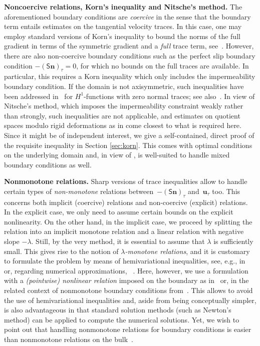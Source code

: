 \documentclass[reqno,a4paper]{amsart}
\def\tens#1{\pmb{\mathsf{#1}}}
\def\vec#1{\boldsymbol{#1}}
\def\bn{\vec{n}}
\def\bu{\vec{u}}
\def\BS{\tens{S}}
\begin{document}
	\textbf{Noncoercive relations, Korn's inequality and Nitsche's method.} 
	The aforementioned boundary conditions are  \emph{coercive} in the sense that the boundary term entails estimates on the tangential velocity traces. 
	In this case, one may employ standard versions of Korn's inequality to bound the norms of the full gradient in terms of the symmetric gradient and a \emph{full} trace term, see~\cite{Nitsche1981, BulicekMalekRajagopal2007}. 
	However, there are also non-coercive boundary conditions such as the perfect slip boundary condition $-(\BS \bn)_{\tau} = 0$, for which no bounds on the full traces are available. In particular, this requires  a Korn inequality which only includes the impermeability boundary condition. 
	If the domain is not axisymmetric, such inequalities have been addressed in~\cite{DesvillettesVillani2002} for $H^{1}$-functions with zero normal traces; see also~\cite{Bauer2016,BP.2016,Dominguez2022}. 
	In view of Nitsche's method, which imposes the impermeability constraint weakly rather than strongly, such inequalities are not applicable, and  estimates on quotient spaces modulo rigid deformations as in \cite[(2.5)-(2.6)]{V.1987} come closest to what is required here. Since it might be of independent interest, we give a self-contained, direct proof of the requisite inequality in Section \ref{sec:korn}. This comes with optimal conditions on the underlying domain and, {in view of} \cite{LeRoux.2005, AABS.2019, WLHJ.2020}, is well-suited to handle mixed boundary conditions as well. 
	\medskip 
	
	\textbf{Nonmonotone relations.} Sharp versions of trace inequalities allow to handle certain types of \emph{non-monotone} relations between~$-(\BS\bn)_{\tau}$ and~$\bu_{\tau}$ too.  
	This concerns both implicit (coercive) relations and non-coercive (explicit) relations. 
	In the explicit case, we only need to assume certain bounds on the explicit {nonlinearity}. 
	On the other hand, in the implicit case, we proceed by splitting the relation into an implicit monotone relation and a linear relation with negative slope $-\lambda$.  
	Still, by the very method, it is essential to assume that $\lambda$ is sufficiently small. This gives rise to the notion of \emph{$\lambda$-monotone relations}, and it is customary to formulate the problem by means of hemivariational inequalities, see, e.g., in~\cite{Fang2016,MP.2018,MD.2022} or, regarding numerical approximations, ~\cite{Fang2020,HCJ.2021}. 
	Here, however, we use a formulation with a \emph{(pointwise) nonlinear relation} imposed on the boundary as in~\cite{Abbatiello2021,BulicekMalekMaringova2023} or, in the related context of nonmonotone boundary conditions from~\cite{BulicekMalek2019}. This allows to avoid the use of hemivariational inequalities and, aside from being conceptually simpler, is also advantageous in that standard solution methods (such as Newton's method) can be applied to compute the numerical solutions. Yet, we wish to point out that handling nonmonotone relations for boundary conditions is easier than nonmonotone relations on the bulk~\cite{LeRoux2013, JaneckaMalekProcircusaEtAl2019}. 
	\medskip
	
\end{document}

